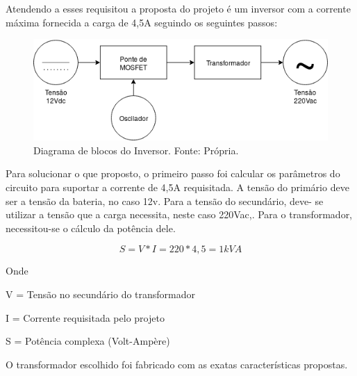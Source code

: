                 Atendendo a esses requisitou a proposta do projeto é um inversor com a 							corrente máxima fornecida a carga de 4,5A seguindo os seguintes passos:
                
                \begin{figure}[!htb]
            		\centering
            		\includegraphics[scale= 0.4]{figuras/Diagrama_Inversor.png}
            		\caption{Diagrama de blocos do Inversor. Fonte: Própria.}
            		\label{diagrama-inversor}
            	\end{figure} 
            	Para solucionar o que proposto, o primeiro passo foi calcular os parâmetros do 				circuito para suportar a corrente de 4,5A requisitada. A tensão do primário 					deve ser a tensão da bateria, no caso 12v. Para a tensão do secundário, deve-					se utilizar a tensão que a carga necessita, neste caso 220Vac,. Para o 							transformador, necessitou-se o cálculo da potência dele.    
            	
            	\begin{equation}
                	S = V*I = 220*4,5 = 1kVA
            	\end{equation}
                
                Onde	
                
                V = Tensão no secundário do transformador
                
				I = Corrente requisitada pelo projeto
	
				S = Potência complexa (Volt-Ampère)
				
				O transformador escolhido foi fabricado com as exatas características 							propostas.		

